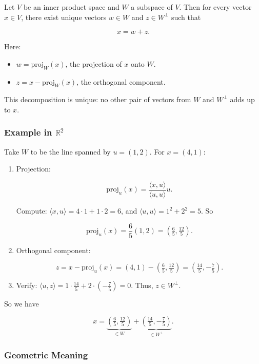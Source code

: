 \documentclass[
  letterpaper,
  DIV=11,
  numbers=noendperiod]{scrreprt}
\providecommand{\tightlist}{%
  \setlength{\itemsep}{0pt}\setlength{\parskip}{0pt}}
\begin{document}
Let \(V\) be an inner product space and \(W\) a subspace of \(V\). Then
for every vector \(x \in V\), there exist unique vectors \(w \in W\) and
\(z \in W^\perp\) such that

\[
x = w + z.
\]

Here:

\begin{itemize}
\tightlist
\item
  \(w = \text{proj}_W(x)\), the projection of \(x\) onto \(W\).
\item
  \(z = x - \text{proj}_W(x)\), the orthogonal component.
\end{itemize}

This decomposition is unique: no other pair of vectors from \(W\) and
\(W^\perp\) adds up to \(x\).

\subsubsection{\texorpdfstring{Example in
\(\mathbb{R}^2\)}{Example in \textbackslash mathbb\{R\}\^{}2}}\label{example-in-mathbbr2-5}

Take \(W\) to be the line spanned by \(u = (1,2)\). For \(x = (4,1)\):

\begin{enumerate}
\def\labelenumi{\arabic{enumi}.}
\item
  Projection:

  \[
  \text{proj}_u(x) = \frac{\langle x,u \rangle}{\langle u,u \rangle} u.
  \]

  Compute: \(\langle x,u\rangle = 4\cdot 1 + 1\cdot 2 = 6\), and
  \(\langle u,u\rangle = 1^2+2^2=5\). So

  \[
  \text{proj}_u(x) = \frac{6}{5}(1,2) = \left(\tfrac{6}{5}, \tfrac{12}{5}\right).
  \]
\item
  Orthogonal component:

  \[
  z = x - \text{proj}_u(x) = (4,1) - \left(\tfrac{6}{5}, \tfrac{12}{5}\right) = \left(\tfrac{14}{5}, -\tfrac{7}{5}\right).
  \]
\item
  Verify:
  \(\langle u, z\rangle = 1\cdot \tfrac{14}{5} + 2\cdot (-\tfrac{7}{5}) = 0\).
  Thus, \(z \in W^\perp\).
\end{enumerate}

So we have

\[
x = \underbrace{\left(\tfrac{6}{5}, \tfrac{12}{5}\right)}_{\in W} + \underbrace{\left(\tfrac{14}{5}, -\tfrac{7}{5}\right)}_{\in W^\perp}.
\]

\subsubsection{Geometric Meaning}\label{geometric-meaning-19}
\end{document}
